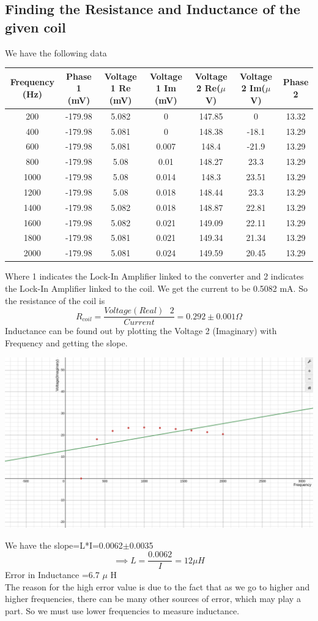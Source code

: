 \documentclass[]{report}[12 pt]
\begin{document}
\subsection*{Finding the Resistance and Inductance of the given coil}
We have the following data 
\begin{center}
	\begin{tabular}{|c|c|c|c|c|c|c|}
		\hline
		Frequency (Hz)  & Phase 1 (mV) & Voltage 1 Re (mV) & Voltage 1 Im (mV) & Voltage 2 Re($\mu$V) & Voltage 2 Im($\mu$V) & Phase 2 \\
		\hline
		200 & -179.98 & 5.082 & 0 & 147.85 & 0 & 13.32 \\
		\hline
		400 & -179.98 & 5.081 & 0 & 148.38 & -18.1 & 13.29 \\
		\hline
		600 & -179.98 & 5.081 & 0.007 & 148.4 & -21.9 & 13.29 \\
		\hline
		800 & -179.98 & 5.08 & 0.01 & 148.27 & 23.3 & 13.29 \\
		\hline
		1000 & -179.98 & 5.08 & 0.014 & 148.3 & 23.51 & 13.29 \\
		\hline
		1200 & -179.98 & 5.08 & 0.018 & 148.44 & 23.3 & 13.29 \\
		\hline
		1400 & -179.98 & 5.082 & 0.018 & 148.87 & 22.81 & 13.29 \\
		\hline
		1600 & -179.98 & 5.082 & 0.021 & 149.09 & 22.11 & 13.29 \\
		\hline
		1800 & -179.98 & 5.081 & 0.021 & 149.34 & 21.34 & 13.29 \\
		\hline
		2000 & -179.98 & 5.081 & 0.024 & 149.59 & 20.45 & 13.29 \\
		\hline
	\end{tabular}
\end{center}
Where 1 indicates the Lock-In Amplifier linked to the converter and 2 indicates the Lock-In Amplifier linked to the coil. We get the current to be 0.5082 mA.
So the resistance of the coil is 
\[R_{coil}=\frac{Voltage(Real)\text{   }2}{Current}=0.292 \pm 0.001  \Omega \]
Inductance can be found out by plotting the Voltage 2 (Imaginary) with Frequency and getting the slope.
\begin{center}
	\includegraphics[width=10 cm]{ind.png}
\end{center}
We have the slope=L*I=0.0062$\pm$0.0035
\[\implies L = \frac{0.0062}{I}=12 \mu H\]
Error in Inductance =6.7 $\mu$ H\\
The reason for the high error value is due to the fact that as we go to higher and higher frequencies, there can be many other sources of error, which may play a part. So we must use lower frequencies to measure inductance.
\end{document}
